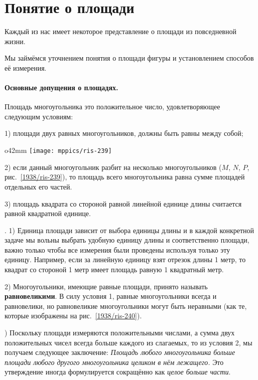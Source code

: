 \section{Понятие о площади}

Каждый из нас имеет некоторое представление о площади из повседневной жизни.

Мы займёмся уточнением понятия о площади фигуры и установлением способов её измерения.

\paragraph{Основные допущения о площадях.}\label{1938/243}
Площадь многоугольника это положительное число, удовлетворяющее следующим условиям:

1) площади двух равных многоугольников, должны быть равны между собой; 

\begin{wrapfigure}{o}{42mm}
\centering
\texttt{[image: mppics/ris-239]}
\caption{}\label{1938/ris-239}
\end{wrapfigure}

2) если данный многоугольник разбит на несколько многоугольников ($M$, $N$, $P$, рис.~\ref{1938/ris-239}), то  площадь всего многоугольника равна сумме площадей отдельных его частей.

3) площадь квадрата со стороной равной линейной единице длины считается равной квадратной единице.

{\small
\smallskip
\mbox{.}
1) Единица площади зависит от выбора единицы длины и в каждой конкретной задаче мы вольны выбрать удобную единицу длины и соответственно площади, важно только чтобы все измерения были проведены используя только эту единицу.
Например, если за линейную единицу взят отрезок длины 1 метр, то квадрат со стороной 1 метр имеет площадь равную 1 квадратный метр.

2) Многоугольники, имеющие равные площади, принято называть \textbf{равновеликими}.
В силу условия 1, равные многоугольники всегда и равновелики, но равновеликие многоугольники могут быть неравными (как те, которые изображены на рис.~\ref{1938/ris-240}).

{) Поскольку площади измеряются положительными числами, а сумма двух положительных чисел всегда больше каждого из слагаемых, то из условия 2, мы получаем следующее заключение:
\emph{Площадь любого многоугольника больше площади любого другого многоугольника целиком в нём лежащего.}
Это утверждение иногда формулируется сокращённо как \emph{целое больше части}.
}

}

